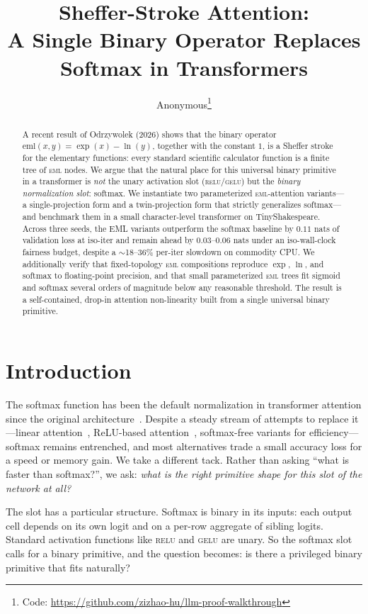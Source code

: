 \documentclass{article}
\title{Sheffer-Stroke Attention:\\
A Single Binary Operator Replaces Softmax in Transformers}
\author{%
  Anonymous\thanks{Code: \url{https://github.com/zizhao-hu/llm-proof-walkthrough}}\\
}
\begin{document}
\maketitle

\begin{abstract}
A recent result of Odrzywolek (2026) shows that the binary operator
$\mathrm{eml}(x, y) = \exp(x) - \ln(y)$, together with the constant $1$,
is a Sheffer stroke for the elementary functions: every standard scientific
calculator function is a finite tree of \textsc{eml} nodes. We argue that
the natural place for this universal binary primitive in a transformer is
\emph{not} the unary activation slot (\textsc{relu}/\textsc{gelu}) but the
\emph{binary normalization slot}: softmax. We instantiate two parameterized
\textsc{eml}-attention variants---a single-projection form and a
twin-projection form that strictly generalizes softmax---and benchmark them
in a small character-level transformer on TinyShakespeare. Across three
seeds, the EML variants outperform the softmax baseline by $0.11$ nats of
validation loss at iso-iter and remain ahead by $0.03$--$0.06$ nats under an
iso-wall-clock fairness budget, despite a $\sim$18--36\% per-iter slowdown
on commodity CPU. We additionally verify that fixed-topology \textsc{eml}
compositions reproduce $\exp$, $\ln$, and softmax to floating-point precision,
and that small parameterized \textsc{eml} trees fit sigmoid and softmax
several orders of magnitude below any reasonable threshold. The result is
a self-contained, drop-in attention non-linearity built from a single
universal binary primitive.
\end{abstract}

\section{Introduction}

The softmax function has been the default normalization in transformer
attention since the original architecture~\citep{vaswani2017attention}.
Despite a steady stream of attempts to replace it---linear
attention~\citep{katharopoulos2020transformers},
ReLU-based attention~\citep{wortsman2023replacing},
softmax-free variants for efficiency---softmax remains entrenched, and most
alternatives trade a small accuracy loss for a speed or memory gain. We
take a different tack. Rather than asking ``what is faster than softmax?'',
we ask: \emph{what is the right primitive shape for this slot of the
network at all?}

The slot has a particular structure. Softmax is binary in its inputs:
each output cell depends on its own logit and on a per-row aggregate of
sibling logits. Standard activation functions like \textsc{relu} and
\textsc{gelu} are unary. So the softmax slot calls for a binary primitive,
and the question becomes: is there a privileged binary primitive that fits
naturally?
\end{document}
